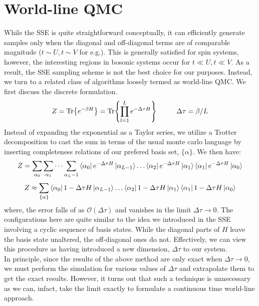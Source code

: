 \section{World-line QMC}
While the SSE is quite straightforward conceptually, it can efficiently generate samples only when the diagonal and off-diagonal terms are of comparable magnitude\cite{Sandvik_2010} ($t \sim U, t \sim V$ for e.g.). This is generally satisfied for spin systems, however, the interesting regions in bosonic systems occur for $t \ll U, t \ll V$. As a result, the SSE sampling scheme is not the best choice for our purposes. Instead, we turn to a related class of algorithms loosely termed as world-line QMC\cite{schneider2008}. We first discuss the discrete formulation.
\begin{equation}
    Z = \Tr{e^{-\beta H}}  = \Tr{\prod_{l = 1}^L e^{-\Delta\tau H}} \hspace{1cm} \Delta \tau = \beta/L
\end{equation}
Instead of expanding the exponential as a Taylor series, we utilize a Trotter decomposition to cast the sum in terms of the usual monte carlo language by inserting completeness relations of our prefered basis set, $\{\alpha \}$. We then have:
\begin{equation}
    Z = \sum_{\alpha_0}\sum_{\alpha_1}\dots\sum_{\alpha_L - 1} \bra{\alpha_0}e^{-\Delta\tau H}\ket{\alpha_{L-1}}\dots \bra{\alpha_2}e^{-\Delta\tau H}\ket{\alpha_1}\bra{\alpha_1}e^{-\Delta\tau H}\ket{\alpha_0}
\end{equation}
\begin{equation}
    Z \approx \sum_{\{\alpha\}}\bra{\alpha_0}1 - \Delta \tau H \ket{\alpha_{L-1}}\dots \bra{\alpha_2}1 - \Delta \tau H \ket{\alpha_1}\bra{\alpha_1}1 - \Delta \tau H \ket{\alpha_0}
\end{equation}
where, the error falls of as $\mathcal{O}(\Delta \tau)$ and vanishes in the limit $\Delta\tau \to 0$. The configurations here are quite similar to the idea we introduced in the SSE involving a cyclic sequence of basis states. While the diagonal parts of $H$ leave the basis state unaltered, the off-diagonal ones do not. Effectively, we can view this procedure as having introduced a new dimension, $\Delta \tau$ to our system. 
\vspace{0.5cm}\\
In principle, since the results of the above method are only exact when $\Delta \tau \to 0$, we must perform the simulation for various values of $\Delta \tau$ and extrapolate them to get the exact results. However, it turns out that such a technique is unnecessary as we can, infact, take the limit exactly to formulate a continuous time world-line approach\cite{schneider2008}. 
